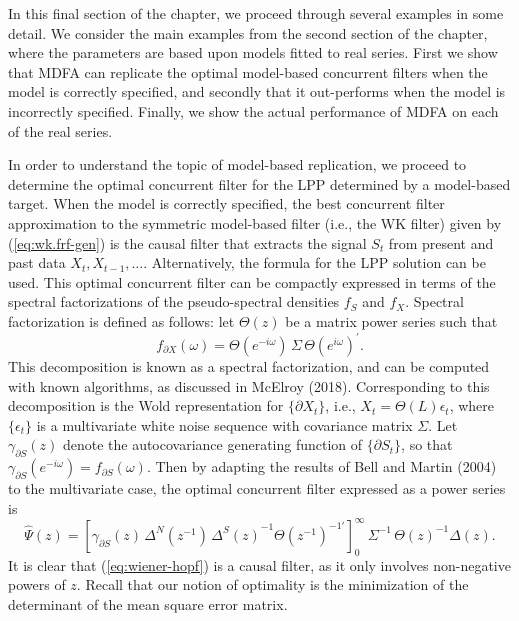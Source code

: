 \documentclass[a4paper]{book}
\begin{document}
In this final section of the chapter, we proceed through several examples
 in some detail.  We consider the main examples from the second section of the
  chapter, where the parameters are based upon models fitted to real series.
  First we show that MDFA can replicate the optimal model-based concurrent filters
  when the model is correctly specified, and secondly that it out-performs
  when the model is incorrectly specified.
  Finally, we show the actual performance of MDFA on each of the real series.
   
  
In order to understand the topic of model-based replication, we proceed
to determine the optimal concurrent filter for the LPP determined by a model-based
target.  When the model is correctly specified, the best concurrent filter 
 approximation to the symmetric model-based filter (i.e., the WK filter) given by
 (\ref{eq:wk.frf-gen}) is the causal filter that extracts the signal $S_t$ from
  present and past data $X_t, X_{t-1}, \ldots$.  Alternatively, the formula
   for the LPP solution can be used.  This optimal concurrent filter can be
   compactly expressed in terms of the spectral factorizations of the 
      pseudo-spectral densities $f_S$ and $f_X$.
    Spectral factorization is defined as follows: 
    let $\Theta (z)$ be a matrix power series such that
 \begin{equation}
 \label{eq:spectral-factor}
  f_{\partial X} (\omega) = \Theta (e^{-i \omega}) \, \Sigma \, 
    {\Theta (e^{i \omega})}^{\prime}.
 \end{equation}
 This decomposition is known as a spectral factorization, and can be computed
 with known algorithms, as discussed in McElroy (2018).
  Corresponding to this decomposition is the Wold representation for $\{ \partial X_t \}$,
   i.e., $X_t = \Theta (L) \epsilon_t$,  where $\{ \epsilon_t \}$ is a multivariate 
   white noise sequence with covariance matrix $\Sigma$. 
  Let $\gamma_{\partial S} (z)$ denote the autocovariance generating function
  of $\{ \partial S_t \}$, so that 
   $\gamma_{\partial S} (e^{-i \omega}) = f_{\partial S} (\omega)$.  
    Then by adapting the results of Bell and Martin (2004) to the multivariate case, 
    the optimal concurrent filter  expressed as a power series is 
\begin{equation}
\label{eq:wiener-hopf}
  \widehat{\Psi} (z) =  
    { \left[  \gamma_{\partial S} (z) \,  \Delta^N (z^{-1}) \, {\Delta^S (z)}^{-1}
     { \Theta (z^{-1})}^{-1 \prime} \right] }_0^{\infty} \, \Sigma^{-1} \,
     { \Theta (z) }^{-1} \Delta (z). 
\end{equation}
  It is clear that (\ref{eq:wiener-hopf}) is a causal filter,
  as it only involves non-negative powers of $z$.
 Recall that our notion of optimality is the minimization of the determinant
 of the mean square error matrix.
\end{document}

